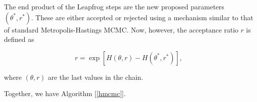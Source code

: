     The end product of the Leapfrog steps are the new proposed parameters $(\theta^*,r^*)$. These are either accepted or rejected using a mechanism similar to that of standard Metropolis-Hastings MCMC. Now, however, the acceptance ratio $r$ is defined as

    \begin{equation}
        r = \exp \left[ H(\theta,r) - H(\theta^*,r^*) \right],
    \end{equation}

    where $(\theta,r)$ are the last values in the chain.

    Together, we have Algorithm [\ref{hmcmc}].

    \begin{algorithm}

        \BlankLine

        \DontPrintSemicolon


        \BlankLine

\end{algorithm}
